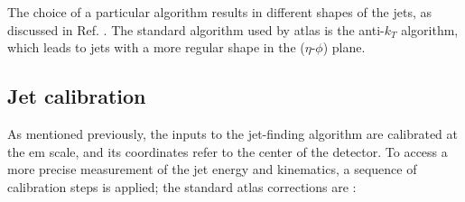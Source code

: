 The choice of a particular algorithm results in different shapes of the jets, as discussed in Ref. \cite{cacciari:antikt}. 
The standard algorithm used by \gls{atlas} is the anti-$k_T$ algorithm, which leads to jets with a more regular shape 
in the ($\eta$-$\phi$) plane. 

\subsection{Jet calibration}
\label{sec:obj:jetcalib}

As mentioned previously, the inputs to the jet-finding algorithm are calibrated at the \gls{em} scale, and its coordinates refer to the center of the detector. To access a more precise measurement of the jet energy and kinematics, a sequence of calibration steps is applied; 
the standard \gls{atlas} corrections are \cite{PhysRevD.96.072002}:


